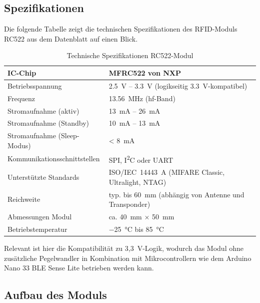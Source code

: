 \subsection{Spezifikationen}

Die folgende Tabelle zeigt die technischen Spezifikationen des RFID-Moduls RC522 aus dem Datenblatt \cite{Handsontec:2023} auf einen Blick.

\begin{table}[H]
	\centering
	\caption{Technische Spezifikationen RC522-Modul \cite{Handsontec:2023,NXP:2016}}
	\label{tab:rc522_specs}
	\begin{tabular}{|l|p{9cm}|}
		\hline
		IC-Chip & MFRC522 von NXP \\
		\hline
		Betriebsspannung & \SI{2,5}{V} -- \SI{3,3}{V} (logikseitig \SI{3,3}{V}-kompatibel) \\
		\hline
		Frequenz & \SI{13,56}{MHz} (\ac{hf}-Band) \\
		\hline
		Stromaufnahme (aktiv) & \SI{13}{mA} -- \SI{26}{mA} \\
		\hline
		Stromaufnahme (Standby) & \SI{10}{mA} -- \SI{13}{mA} \\
		\hline
		Stromaufnahme (Sleep-Modus) & < \SI{8}{mA} \\
		\hline
		Kommunikationsschnittstellen & SPI, I\textsuperscript{2}C oder UART \\
		\hline
		Unterstützte Standards & ISO/IEC~14443~A (MIFARE Classic, Ultralight, NTAG) \\
		\hline
		Reichweite & typ. bis \SI{60}{mm} (abhängig von Antenne und Transponder) \\
		\hline
		Abmessungen Modul & ca. \SI{40}{mm} $\times$ \SI{50}{mm} \\
		\hline
		Betriebstemperatur & \SI{-25}{\degreeCelsius} bis \SI{+85}{\degreeCelsius} \\
		\hline
	\end{tabular}
\end{table}


Relevant ist hier die Kompatibilität zu 3,3~V-Logik, wodurch das Modul ohne zusätzliche Pegelwandler 
in Kombination mit Mikrocontrollern wie dem Arduino Nano 33 BLE Sense Lite betrieben werden kann.


\subsection{Aufbau des Moduls} 

